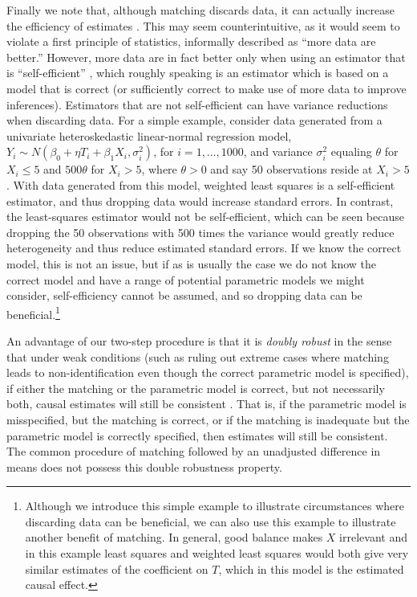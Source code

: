 \documentclass[11pt,titlepage]{article}
\begin{document}
Finally we note that, although matching discards data, it can actually
increase the efficiency of estimates \citep{Smith97}.  This may seem
counterintuitive, as it would seem to violate a first principle of
statistics, informally described as ``more data are better.''
However, more data are in fact better only when using an estimator
that is ``self-efficient'' \citep{MenRom03}, which roughly speaking is
an estimator which is based on a model that is correct (or
sufficiently correct to make use of more data to improve inferences).
Estimators that are not self-efficient can have variance reductions
when discarding data.  For a simple example, consider data generated
from a univariate heteroskedastic linear-normal regression model,
$Y_i\sim N(\beta_0+\eta T_i+\beta_1 X_i,\sigma_i^2)$, for
$i=1,\dots,1000$, and variance $\sigma^2_i$ equaling $\theta$ for
$X_i\leq 5$ and $500\theta$ for $X_i>5$, where $\theta>0$ and say 50
observations reside at $X_i>5$.  With data generated from this model,
weighted least squares is a self-efficient estimator, and thus
dropping data would increase standard errors.  In contrast, the
least-squares estimator would not be self-efficient, which can be seen
because dropping the 50 observations with 500 times the variance would
greatly reduce heterogeneity and thus reduce estimated standard
errors.  If we know the correct model, this is not an issue, but if as
is usually the case we do not know the correct model and have a range
of potential parametric models we might consider, self-efficiency
cannot be assumed, and so dropping data can be
beneficial.\footnote{Although we introduce this simple example to
  illustrate circumstances where discarding data can be beneficial, we
  can also use this example to illustrate another benefit of matching.
  In general, good balance makes $X$ irrelevant and in this example
  least squares and weighted least squares would both give very
  similar estimates of the coefficient on $T$, which in this model is
  the estimated causal effect.}

An advantage of our two-step procedure is that it is \emph{doubly
  robust} in the sense that under weak conditions (such as ruling out
extreme cases where matching leads to non-identification even though
the correct parametric model is specified), if either the matching or
the parametric model is correct, but not necessarily both, causal
estimates will still be consistent \citep[see][]{RobRot01}.  That is,
if the parametric model is misspecified, but the matching is correct,
or if the matching is inadequate but the parametric model is correctly
specified, then estimates will still be consistent.  The common
procedure of matching followed by an unadjusted difference in means
does not possess this double robustness property.
\end{document}

